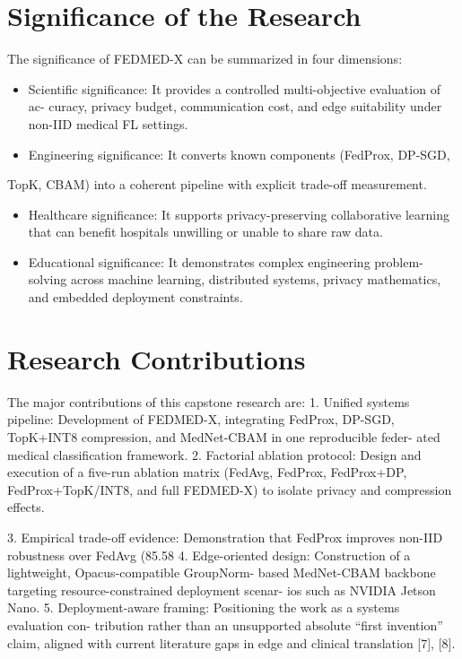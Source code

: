\documentclass[12pt,a4paper]{report}
\begin{document}
\section{Significance of the Research}
The significance of FEDMED-X can be summarized in four dimensions:
\begin{itemize}
\item Scientific significance: It provides a controlled multi-objective evaluation of ac- curacy, privacy budget, communication cost, and edge suitability under non-IID medical FL settings.
\item Engineering significance: It converts known components (FedProx, DP-SGD,
\end{itemize}
TopK, CBAM) into a coherent pipeline with explicit trade-off measurement.
\begin{itemize}
\item Healthcare significance: It supports privacy-preserving collaborative learning that can benefit hospitals unwilling or unable to share raw data.
\item Educational significance: It demonstrates complex engineering problem-solving across machine learning, distributed systems, privacy mathematics, and embedded deployment constraints.
\end{itemize}
\section{Research Contributions}
The major contributions of this capstone research are:
1. Unified systems pipeline: Development of FEDMED-X, integrating FedProx,
DP-SGD, TopK+INT8 compression, and MedNet-CBAM in one reproducible feder- ated medical classification framework.
2. Factorial ablation protocol: Design and execution of a five-run ablation matrix (FedAvg, FedProx, FedProx+DP, FedProx+TopK/INT8, and full FEDMED-X) to isolate privacy and compression effects.

3. Empirical trade-off evidence: Demonstration that FedProx improves non-IID robustness over FedAvg (85.58%
4. Edge-oriented design: Construction of a lightweight, Opacus-compatible GroupNorm- based MedNet-CBAM backbone targeting resource-constrained deployment scenar- ios such as NVIDIA Jetson Nano.
5. Deployment-aware framing: Positioning the work as a systems evaluation con- tribution rather than an unsupported absolute “first invention” claim, aligned with current literature gaps in edge and clinical translation [7], [8].
\end{document}
